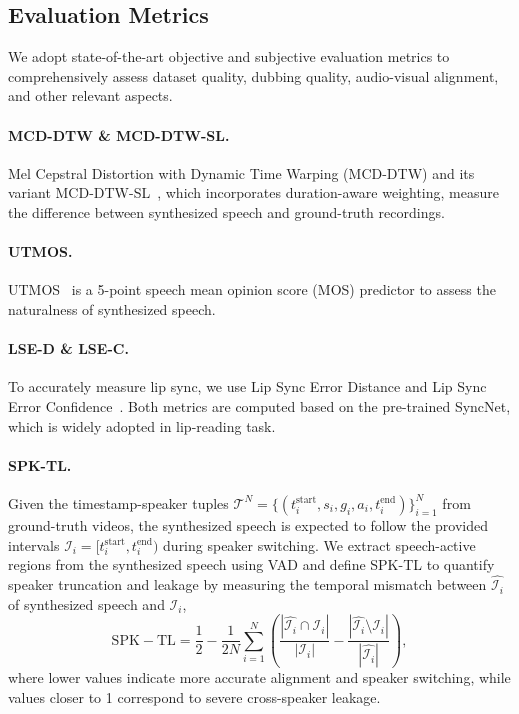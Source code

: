 \documentclass{article}
\begin{document}
\subsection{Evaluation Metrics}
We adopt state-of-the-art objective and subjective evaluation metrics to 
comprehensively assess dataset quality, dubbing quality, audio-visual alignment, and other relevant aspects.

\paragraph{MCD-DTW \& MCD-DTW-SL.}
Mel Cepstral Distortion with Dynamic Time Warping (MCD-DTW) and its variant MCD-DTW-SL~\cite{V2C}, 
which incorporates duration-aware weighting, 
measure the difference between synthesized speech and ground-truth recordings.

\paragraph{UTMOS.}
UTMOS~\cite{UTMOS} is a 5-point speech mean opinion score (MOS) predictor to assess the naturalness of synthesized speech.

\paragraph{LSE-D \& LSE-C.}
To accurately measure lip sync, 
we use Lip Sync Error Distance and Lip Sync Error Confidence~\cite{LSE-D}.
Both metrics are computed based on the pre-trained SyncNet,
which is widely adopted in lip-reading task.

\paragraph{SPK-TL.}
Given the timestamp-speaker tuples $\mathcal{T}^N=\{(t_i^{\text{start}}, s_i, g_i, a_i, t_i^{\text{end}})\}_{i=1}^N$ from ground-truth videos,
the synthesized speech is expected to follow the provided intervals $\mathcal{I}_i=[t_i^{\text{start}}, t_i^{\text{end}})$ during speaker switching.
We extract speech-active regions from the synthesized speech using VAD 
and define SPK-TL to quantify speaker truncation and leakage
by measuring the temporal mismatch between $\hat{\mathcal{I}_i}$ of synthesized speech and $\mathcal{I}_i$,
\begin{equation}
    \mathrm{SPK-TL}=\frac{1}{2}-\frac{1}{2N}\sum_{i=1}^N\left(\frac{|\hat{\mathcal{I}_i}\cap\mathcal{I}_i|}{|\mathcal{I}_i|}-\frac{|\hat{\mathcal{I}_i}\setminus\mathcal{I}_i|}{|\hat{\mathcal{I}_i}|}\right),
\end{equation}
where lower values indicate more accurate alignment and speaker switching,
while values closer to 1 correspond to severe cross-speaker leakage.
\end{document}
